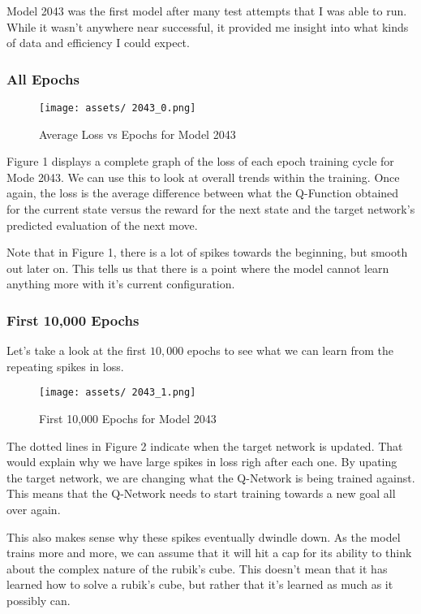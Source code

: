 \documentclass[12pt]{article}
\begin{document}
Model 2043 was the first model after many test attempts that I was able to run. While it wasn't anywhere near successful, it provided me insight into what kinds of data and efficiency I could expect.

\subsubsection{All Epochs}

\begin{figure}[h]
	\centering
	\caption{Average Loss vs Epochs for Model 2043}
	\texttt{[image: assets/ 2043\_0.png]}
\end{figure}

Figure 1 displays a complete graph of the loss of each epoch training cycle for Mode 2043. We can use this to look at overall trends within the training. Once again, the loss is the average difference between what the Q-Function obtained for the current state versus the reward for the next state and the target network's predicted evaluation of the next move.

Note that in Figure 1, there is a lot of spikes towards the beginning, but smooth out later on. This tells us that there is a point where the model cannot learn anything more with it's current configuration.


\subsubsection{First 10,000 Epochs}

Let's take a look at the first $10,000$ epochs to see what we can learn from the repeating spikes in loss.

\begin{figure}[h]
	\centering
	\caption{First 10,000 Epochs for Model 2043}
	\texttt{[image: assets/ 2043\_1.png]}
\end{figure}

The dotted lines in Figure 2 indicate when the target network is updated. That would explain why we have large spikes in loss righ after each one. By upating the target network, we are changing what the Q-Network is being trained against. This means that the Q-Network needs to start training towards a new goal all over again.

This also makes sense why these spikes eventually dwindle down. As the model trains more and more, we can assume that it will hit a cap for its ability to think about the complex nature of the rubik's cube. This doesn't mean that it has learned how to solve a rubik's cube, but rather that it's learned as much as it possibly can.
\end{document}
